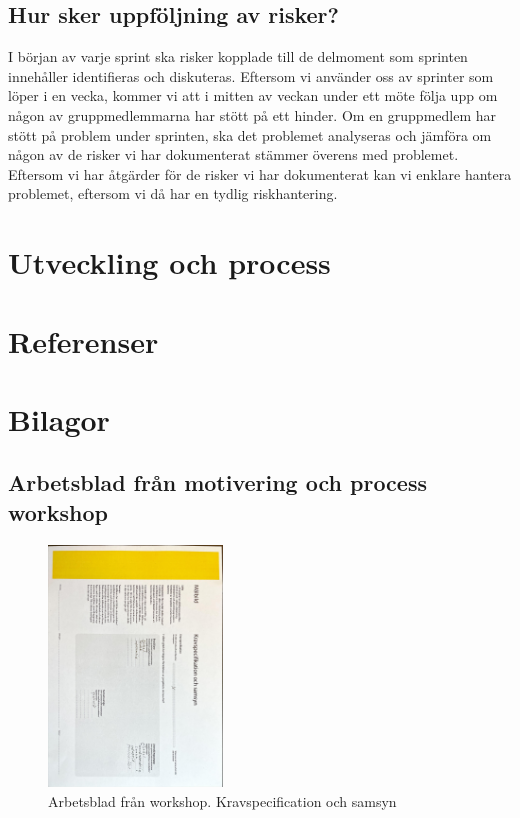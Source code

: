 \documentclass[12pt]{article}
\begin{document}
  \subsection{Hur sker uppföljning av risker?}
I början av varje sprint ska risker kopplade till de delmoment som sprinten innehåller identifieras och diskuteras. Eftersom vi använder oss av sprinter som löper i en vecka, kommer vi att i mitten av veckan under ett möte följa upp om någon av gruppmedlemmarna har stött på ett hinder. Om en gruppmedlem har stött på problem under sprinten, ska det problemet analyseras och jämföra om någon av de risker vi har dokumenterat stämmer överens med problemet. Eftersom vi har åtgärder för de risker vi har dokumenterat kan vi enklare hantera problemet, eftersom vi då har en tydlig riskhantering.


\section{Utveckling och process}


\section{Referenser}

\section{Bilagor}
\subsection{Arbetsblad från motivering och process workshop}


\begin{figure}[htp]
    \centering
    \includegraphics[width = 175px,angle=90]{KS.jpg}
    \caption{Arbetsblad från workshop. Kravspecification och samsyn}
    \label{fig:Bilaga samsyn}
\end{figure}
\end{document}
